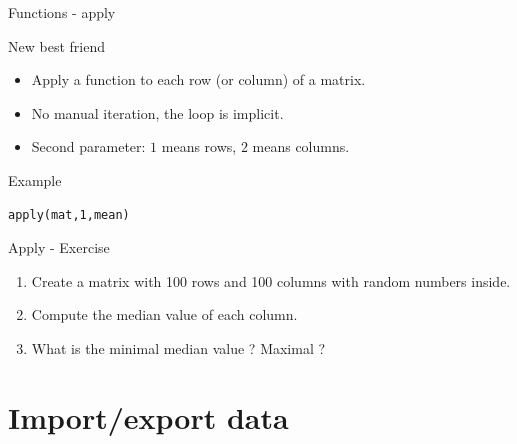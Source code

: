 \documentclass[10pt]{beamer}
\begin{document}

\begin{frame}[fragile]{Functions - {\sf apply}}
  \begin{block}{New best friend}
    \begin{itemize}
    \item Apply a function to each row (or column) of a {\sf matrix}.
    \item No manual iteration, the loop is implicit.
    \item Second parameter: $1$ means rows, $2$ means columns.
    \end{itemize}
  \end{block}
  \begin{exampleblock}{Example}
\begin{verbatim}
apply(mat,1,mean)
\end{verbatim}  
  \end{exampleblock}
\end{frame}


\begin{frame}{Apply - Exercise}
 
  \begin{enumerate}
  \item Create a {\sf matrix} with 100 rows and 100 columns with random numbers inside.
  \item Compute the median value of each column.
  \item What is the minimal median value ? Maximal ?
  \end{enumerate}
  
\end{frame}






\section{Import/export data}
\end{document}
